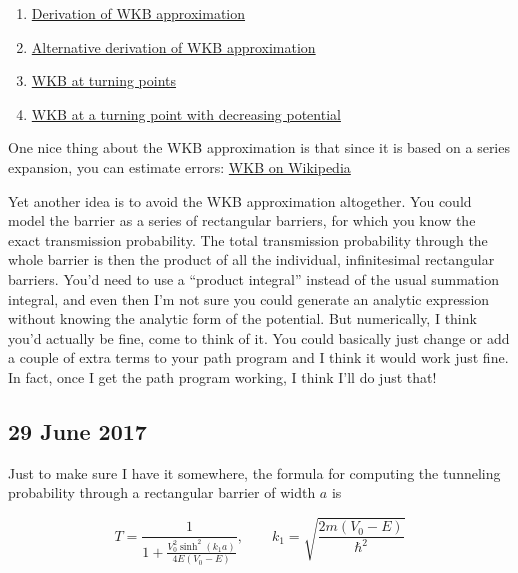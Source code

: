 \documentclass[]{report}
\begin{document}
\begin{enumerate}
\item \href{http://www.physicspages.com/2014/07/03/wkb-approximation-tunneling/}{Derivation of WKB approximation}
\item \href{http://www.physicspages.com/2014/06/30/wkb-approximation-alternative-derivation/}{Alternative derivation of WKB approximation}
\item \href{http://www.physicspages.com/2014/07/09/wkb-approximation-turning-points/}{WKB at turning points}
\item \href{http://www.physicspages.com/2014/07/14/wkb-approximation-at-a-turning-point-with-decreasing-potential/}{WKB at a turning point with decreasing potential}
\end{enumerate}

\noindent One nice thing about the WKB approximation is that since it is based on a series expansion, you can estimate errors: \href{https://en.wikipedia.org/wiki/WKB_approximation#Precision_of_the_asymptotic_series}{WKB on Wikipedia}

Yet another idea is to avoid the WKB approximation altogether. You could model the barrier as a series of rectangular barriers, for which you know the exact transmission probability. The total transmission probability through the whole barrier is then the product of all the individual, infinitesimal rectangular barriers. You'd need to use a ``product integral'' instead of the usual summation integral, and even then I'm not sure you could generate an analytic expression without knowing the analytic form of the potential. But numerically, I think you'd actually be fine, come to think of it. You could basically just change or add a couple of extra terms to your path program and I think it would work just fine. In fact, once I get the path program working, I think I'll do just that!

\subsection*{29 June 2017}

Just to make sure I have it somewhere, the formula for computing the tunneling probability through a rectangular barrier of width $a$ is

\begin{equation}
T = \frac{1}{1+\frac{V_0^2\sinh^2(k_1a)}{4E(V_0-E)}}, \qquad k_1 = \sqrt{\frac{2m(V_0-E)}{\hbar^2}}
\end{equation}
\end{document}
